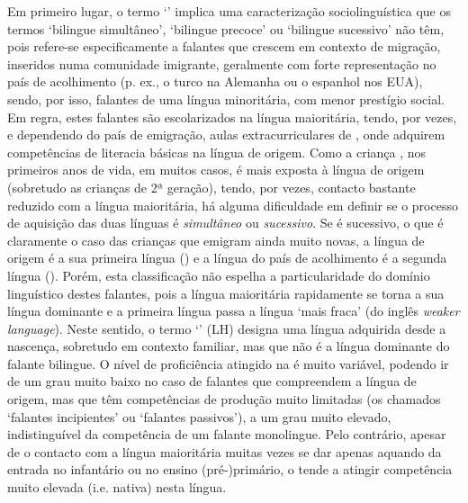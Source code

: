 \documentclass[output=paper]{LSP/langsci}
\begin{document}
Em primeiro lugar, o termo `' implica uma caracterização sociolinguística que os termos `bilingue simultâneo', `bilingue precoce' ou `bilingue sucessivo' não têm, pois refere-se especificamente a falantes que crescem em contexto de migração, inseridos numa comunidade imigrante, geralmente com forte representação no país de acolhimento (p. ex., o turco na Alemanha ou o espanhol nos EUA), sendo, por isso, falantes de uma língua minoritária, com menor prestígio social. Em regra, estes falantes são escolarizados na língua maioritária, tendo, por vezes, e dependendo do país de emigração, aulas extracurriculares de , onde adquirem competências de literacia básicas na língua de origem. Como a criança , nos primeiros anos de vida, em muitos casos, é mais exposta à língua de origem (sobretudo as crianças de 2ª geração), tendo, por vezes, contacto bastante reduzido com a língua maioritária, há alguma dificuldade em definir se o processo de aquisição das duas línguas é \textit{simultâneo} ou \textit{sucessivo}. Se é sucessivo, o que é claramente o caso das crianças que emigram ainda muito novas, a língua de origem é a sua primeira língua () e a língua do país de acolhimento é a segunda língua (). Porém, esta classificação não espelha a particularidade do domínio linguístico destes falantes, pois a língua maioritária rapidamente se torna a sua língua dominante e a primeira língua passa a língua `mais fraca' (do inglês \textit{weaker language}). Neste sentido, o termo `' (LH) designa uma língua adquirida desde a nascença, sobretudo em contexto familiar, mas que não é a língua dominante do falante bilingue. O nível de proficiência atingido na  é muito variável, podendo ir de um grau muito baixo no caso de falantes que compreendem a língua de origem, mas que têm competências de produção muito limitadas (os chamados `falantes incipientes' ou `falantes passivos'), a um grau muito elevado, indistinguível da competência de um falante monolingue. Pelo contrário, apesar de o contacto com a língua maioritária muitas vezes se dar apenas aquando da entrada no infantário ou no ensino (pré-)primário, o  tende a atingir competência muito elevada (i.e. nativa) nesta língua. 
\end{document}

